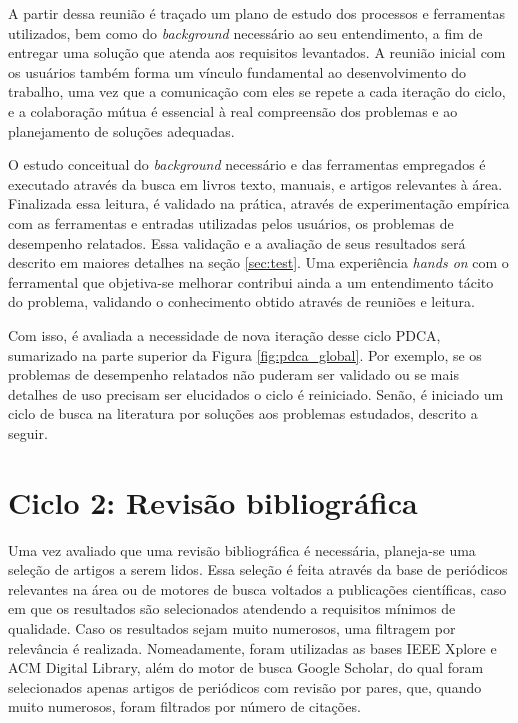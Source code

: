 \documentclass[cic,tc]{iiufrgs}
\begin{document}
A partir dessa reunião é traçado um plano de estudo dos processos e ferramentas
utilizados, bem como do \textit{background} necessário ao seu entendimento, a
fim de entregar uma solução que atenda aos requisitos levantados. A reunião
inicial com os usuários também forma um vínculo fundamental ao desenvolvimento
do trabalho, uma vez que a comunicação com eles se repete a cada iteração do
ciclo, e a colaboração mútua é essencial à real compreensão dos problemas e ao
planejamento de soluções adequadas.

O estudo conceitual do \textit{background} necessário e das ferramentas
empregados é executado através da busca em livros texto, manuais, e artigos
relevantes à área. Finalizada essa leitura, é validado na prática, através de
experimentação empírica com as ferramentas e entradas utilizadas pelos
usuários, os problemas de desempenho relatados. Essa validação e a avaliação de
seus resultados será descrito em maiores detalhes na seção \ref{sec:test}. Uma
experiência \textit{hands on} com o ferramental que objetiva-se melhorar
contribui ainda a um entendimento tácito do problema, validando o conhecimento
obtido através de reuniões e leitura. 

Com isso, é avaliada a necessidade de nova iteração desse ciclo PDCA,
sumarizado na parte superior da Figura \ref{fig:pdca_global}. Por exemplo, se
os problemas de desempenho relatados não puderam ser validado ou se mais
detalhes de uso precisam ser elucidados o ciclo é reiniciado. Senão, é iniciado
um ciclo de busca na literatura por soluções aos problemas estudados, descrito
a seguir.

\section{Ciclo 2: Revisão bibliográfica}
\label{sec:lit}

Uma vez avaliado que uma revisão bibliográfica é necessária, planeja-se uma
seleção de artigos a serem lidos. Essa seleção é feita através da base de
periódicos relevantes na área ou de motores de busca voltados a publicações
científicas, caso em que os resultados são selecionados atendendo a requisitos
mínimos de qualidade. Caso os resultados sejam muito numerosos, uma filtragem
por relevância é realizada. Nomeadamente, foram utilizadas as bases IEEE Xplore
e ACM Digital Library, além do motor de busca Google Scholar, do qual foram
selecionados apenas artigos de periódicos com revisão por pares, que, quando
muito numerosos, foram filtrados por número de citações.
\end{document}
